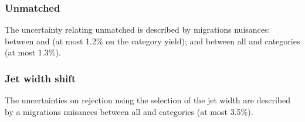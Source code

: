 \subsubsection{Unmatched \PU}
The uncertainty relating unmatched \PU is described by migrations nuisances: between  and  (at most 1.2\% on the category yield); and between all \VBF and \Untagged categories (at most 1.3\%).

\subsubsection{Jet width shift}
The uncertainties on \PU rejection using the selection of the jet width are described by a migrations nuisances between all \VBF and \Untagged categories (at most 3.5\%).
